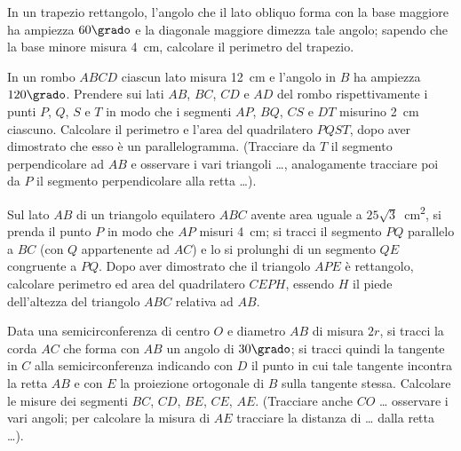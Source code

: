 \begin{multicols}{2}
\begin{esercizio}
\label{ese:7.87}
In un trapezio rettangolo, l'angolo che il lato obliquo forma con la 
base maggiore ha ampiezza \(60\grado\) e la diagonale maggiore dimezza 
tale angolo; sapendo che la base minore misura 4~cm,  calcolare il 
perimetro del trapezio.
\end{esercizio}

\begin{esercizio}
\label{ese:7.88}
In un rombo \(ABCD\) ciascun lato misura 12~cm e l'angolo in \(B\) ha 
ampiezza \(120\grado\). Prendere sui lati \(AB\), \(BC\), \(CD\) e \(AD\) del 
rombo rispettivamente i punti \(P\), \(Q\), \(S\) e \(T\) in modo che i 
segmenti \(AP\), \(BQ\), \(CS\) e \(DT\) misurino 2~cm ciascuno. Calcolare il 
perimetro e l'area del quadrilatero \(PQST\), dopo aver dimostrato che 
esso è un parallelogramma. (Tracciare da \(T\) il segmento 
perpendicolare ad \(AB\) e osservare i vari triangoli \ldots{}, 
analogamente tracciare poi da \(P\) il segmento perpendicolare alla 
retta \ldots{}).  
\end{esercizio}

\begin{esercizio}
\label{ese:7.89}
Sul lato \(AB\) di un triangolo equilatero \(ABC\) avente area uguale a 
\(25\sqrt{3}\)~cm\textsuperscript{2}, si prenda il punto \(P\) in modo 
che \(AP\) misuri 4~cm; si tracci il segmento \(PQ\) parallelo a \(BC\) (con 
\(Q\) appartenente ad \(AC\)) e lo si prolunghi di un segmento \(QE\) 
congruente a \(PQ\). Dopo aver dimostrato che il triangolo \(APE\) è 
rettangolo, calcolare perimetro ed area del quadrilatero \(CEPH\), 
essendo \(H\) il piede dell'altezza del triangolo \(ABC\) relativa ad 
\(AB\).
\end{esercizio}

\begin{esercizio}
\label{ese:7.90}
Data una semicirconferenza di centro \(O\) e diametro \(AB\) di misura 
\(2r\), si tracci la corda \(AC\) che forma con \(AB\) un angolo di 
\(30\grado\); si tracci quindi la tangente in \(C\) alla 
semicirconferenza indicando con \(D\) il punto in cui tale tangente 
incontra la retta \(AB\) e con \(E\) la proiezione ortogonale di \(B\) sulla 
tangente stessa. Calcolare le misure dei segmenti \(BC\), \(CD\), \(BE\), 
\(CE\), \(AE\). (Tracciare anche \(CO\) \ldots{} osservare i vari angoli; 
per calcolare la misura di \(AE\) tracciare la distanza di \ldots{} 
dalla retta \ldots{}).
\end{esercizio}


\end{multicols}
